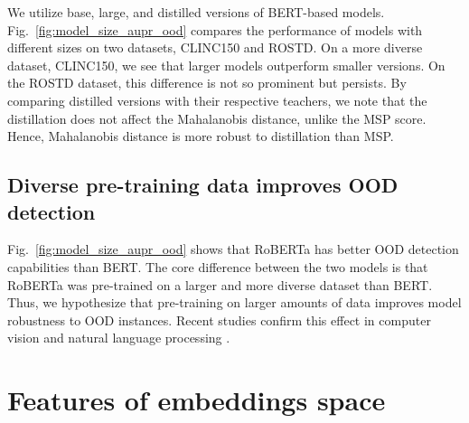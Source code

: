 \documentclass[letterpaper, final]{article} %
\begin{document}
We utilize base, large, and distilled versions of BERT-based models. Fig.~\ref{fig:model_size_aupr_ood} compares the performance of models with different sizes on two datasets, CLINC150 and ROSTD. On a more diverse dataset, CLINC150, we see that larger models outperform smaller versions. On the ROSTD dataset, this difference is not so prominent but persists. By comparing distilled versions with their respective teachers, we note that the distillation does not affect the Mahalanobis distance, unlike the MSP score. Hence, Mahalanobis distance is more robust to distillation than MSP. 

\subsection{Diverse pre-training data improves OOD detection}

 Fig.~\ref{fig:model_size_aupr_ood} shows that RoBERTa has better OOD detection capabilities than BERT. The core difference between the two models is that RoBERTa was pre-trained on a larger and more diverse dataset than BERT. Thus, we hypothesize that pre-training on larger amounts of data improves model robustness to OOD instances. Recent studies confirm this effect in computer vision \cite{hendrycks_pretraining19,orhan2019robustness} and natural language processing \cite{Hendrycks2020PretrainedTI}.
 
\section{Features of embeddings space} 
\end{document}
